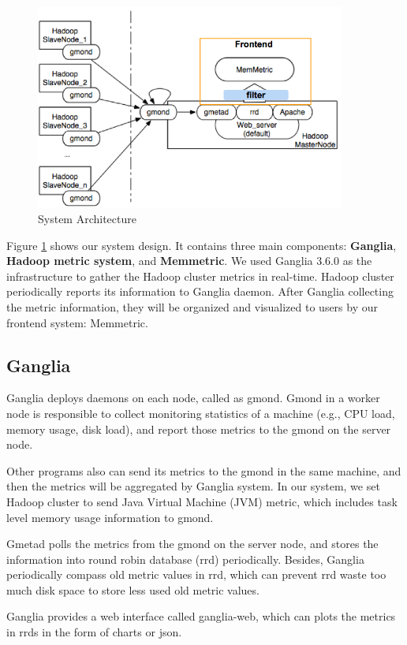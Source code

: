 \begin{figure}[ht]
  \centering
    \includegraphics[width=4.0in]{image/architecture.png}
    \caption{System Architecture}
    \label{ref:architecture}
\end{figure}

Figure \ref{ref:architecture} shows our system design. It contains three main components: \textbf{Ganglia}, \textbf{Hadoop metric system}, and \textbf{Memmetric}. We used Ganglia 3.6.0 as the infrastructure to gather the  Hadoop cluster metrics in real-time. Hadoop cluster periodically reports its information to Ganglia daemon. After Ganglia collecting the metric information, they will be organized and visualized to users by our frontend system: Memmetric.

\subsection{Ganglia}

Ganglia deploys daemons on each node, called as gmond. Gmond in a worker node is responsible to collect monitoring statistics of a machine (e.g., CPU load, memory usage, disk load), and report those metrics to the gmond on the server node. 

Other programs also can send its metrics to the gmond in the same machine, and then the metrics will be aggregated by Ganglia system. In our system, we set Hadoop cluster to send Java Virtual Machine (JVM) metric, which includes task level memory usage information to gmond.

Gmetad polls the metrics from the gmond on the server node, and stores the information into round robin database (rrd) periodically. Besides, Ganglia periodically compass old metric values in rrd, which can prevent rrd waste too much disk space to store less used old metric values.

Ganglia provides a web interface called ganglia-web, which can plots the metrics in rrds in the form of charts or json. 

